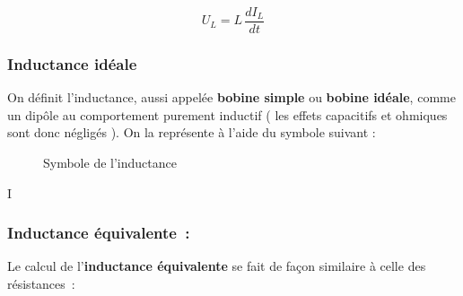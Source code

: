\begin{equation}
	U_L = L \, \dfrac{dI_L}{dt}
\end{equation}

\subsubsection{ Inductance idéale }
On définit l'inductance, aussi appelée \textbf{bobine simple} ou \textbf{bobine idéale}, comme un dipôle au comportement purement inductif ( les effets capacitifs et ohmiques sont donc négligés ). On la représente à l’aide du symbole suivant :

\begin{figure}[!h]
\centering

	\caption{Symbole de l'inductance}
\end{figure}

I\subsubsection{ Inductance équivalente~: }

Le calcul de l'\textbf{inductance équivalente} se fait de façon similaire à celle des résistances~:\\ 

